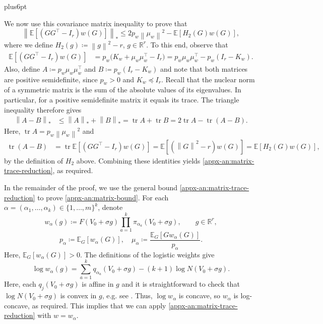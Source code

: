 \documentclass[11pt,letterpaper,twoside,leqno]{article}
\makeatletter
\theoremstyle{bookplain}
\theoremstyle{bookremark}
\renewenvironment{proof}[1][\proofname]{\par
  \pushQED{\qed}\normalfont\topsep6pt plus6pt\relax
  \trivlist\item[\hskip\labelsep\bfseries #1\@addpunct{.}]\ignorespaces
}{\popQED\endtrivlist\@endpefalse}
\newcommand{\E}{\mathbb E}
\newcommand{\R}{\mathbb R}
\newcommand{\tr}{\operatorname{tr}}
\newcommand{\norm}[1]{\left\lVert#1\right\rVert}
\makeatother
\begin{document}
\begin{proof}
We now use this covariance matrix inequality to prove that
\begin{equation}
\left\|\E[(GG^\top-I_r)w(G)]\right\|_*
\le 2p_w\norm{\mu_w}^2
 -\E[H_2(G)w(G)],
\label{appx-an:matrix-trace-reduction}
\end{equation}
where we define \(H_2(g)\coloneqq\norm g^2-r\), $g\in\R^r$. To this end, observe that
\begin{align*}
\E[(GG^\top-I_r)w(G)]
&=p_w\bigl(K_w+\mu_w\mu_w^\top-I_r\bigr)
=p_w\mu_w\mu_w^\top-p_w(I_r-K_w).
\end{align*}
Also, define $A\coloneqq p_w\mu_w\mu_w^\top$ and $B\coloneqq p_w(I_r-K_w)$ and note that
both matrices are positive semidefinite, since
\(p_w>0\) and \(K_w\preceq I_r\).
Recall that the nuclear norm of a symmetric
matrix is the sum of the absolute values of its
eigenvalues. In particular, for a positive
semidefinite matrix it equals its trace.
The triangle inequality therefore gives
\begin{align*}
\norm{A-B}_*
&\le\norm A_*+\norm B_*
=\tr A+\tr B
=2\tr A-\tr(A-B).
\end{align*}
Here, $\tr A=p_w\norm{\mu_w}^2$ and
\begin{align*}
\tr(A-B)
&=\tr\E[(GG^\top-I_r)w(G)]
=\E[(\norm G^2-r)w(G)]
=\E[H_2(G)w(G)],
\end{align*}
by the definition of $H_2$ above. Combining these identities yields \eqref{appx-an:matrix-trace-reduction}, as required.

In the remainder of the proof, we use the general bound \eqref{appx-an:matrix-trace-reduction} to prove \eqref{appx-an:matrix-bound}. For each \(\alpha=(\alpha_1,\ldots,\alpha_k)\in\{1,\dots,m\}^k\), denote
\[
 w_\alpha(g)\coloneqq F(V_0+\sigma g)
                 \prod_{a=1}^k\pi_{\alpha_a}(V_0+\sigma g),\qquad g\in\R^r,
\]
\[
p_\alpha\coloneqq \E_G[w_\alpha(G)],
 \quad \mu_\alpha\coloneqq \frac{\E_G[Gw_\alpha(G)]}{p_\alpha}.
\]
Here, $\E_G[w_\alpha(G)]>0$. The definitions of the logistic weights give
\[
 \log w_\alpha(g)
 =\sum_{a=1}^k q_{\alpha_a}(V_0+\sigma g)
  -(k+1)\log N(V_0+\sigma g).
\]
Here, each \(q_j(V_0+\sigma g)\) is affine in \(g\) and it is straightforward to check that \(\log N(V_0+\sigma g)\) is convex in \(g\), e.g. see \cite[Section~3.1.5, pp.~72--74]{BoydVandenberghe2004}. Thus,
\(\log w_\alpha\) is concave, so \(w_\alpha\) is log-concave, as required. This implies that we can apply \eqref{appx-an:matrix-trace-reduction} with $w=w_\alpha$.



\end{proof}
\end{document}
